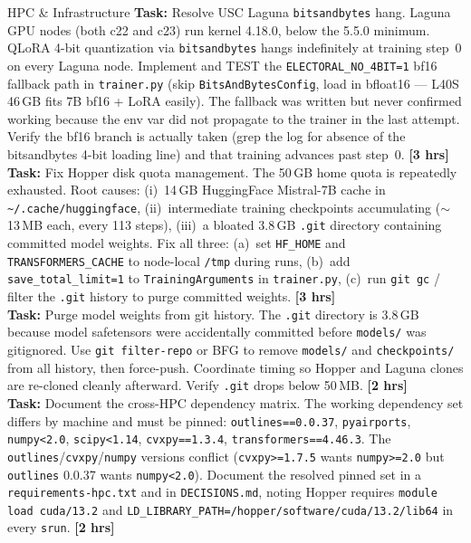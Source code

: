 \documentclass[11pt]{article}
\newcommand{\hrs}[1]{\textbf{[#1 hrs]}}
\newcommand{\task}[2]{%
  \noindent\textbf{Task:} #1 \hfill \hrs{#2}\\}
\begin{document}
\begin{taskbox}{HPC \& Infrastructure}
\task{Resolve USC Laguna \texttt{bitsandbytes} hang. Laguna GPU nodes (both c22
  and c23) run kernel 4.18.0, below the 5.5.0 minimum. QLoRA 4-bit
  quantization via \texttt{bitsandbytes} hangs indefinitely at training step~0
  on every Laguna node. Implement and TEST the \texttt{ELECTORAL\_NO\_4BIT=1}
  bf16 fallback path in \texttt{trainer.py} (skip \texttt{BitsAndBytesConfig},
  load in bfloat16 --- L40S 46\,GB fits 7B bf16 + LoRA easily). The fallback was
  written but never confirmed working because the env var did not propagate to
  the trainer in the last attempt. Verify the bf16 branch is actually taken
  (grep the log for absence of the bitsandbytes 4-bit loading line) and that
  training advances past step~0.}{3}

\task{Fix Hopper disk quota management. The 50\,GB home quota is repeatedly
  exhausted. Root causes: (i)~14\,GB HuggingFace Mistral-7B cache in
  \texttt{\textasciitilde{}/.cache/huggingface}, (ii)~intermediate training
  checkpoints accumulating ($\sim$13\,MB each, every 113 steps),
  (iii)~a bloated 3.8\,GB \texttt{.git} directory containing committed model
  weights. Fix all three: (a)~set \texttt{HF\_HOME} and
  \texttt{TRANSFORMERS\_CACHE} to node-local \texttt{/tmp} during runs,
  (b)~add \texttt{save\_total\_limit=1} to \texttt{TrainingArguments} in
  \texttt{trainer.py}, (c)~run \texttt{git gc} / filter the \texttt{.git}
  history to purge committed weights.}{3}

\task{Purge model weights from git history. The \texttt{.git} directory is
  3.8\,GB because model safetensors were accidentally committed before
  \texttt{models/} was gitignored. Use \texttt{git filter-repo} or BFG to
  remove \texttt{models/} and \texttt{checkpoints/} from all history, then
  force-push. Coordinate timing so Hopper and Laguna clones are re-cloned
  cleanly afterward. Verify \texttt{.git} drops below 50\,MB.}{2}

\task{Document the cross-HPC dependency matrix. The working dependency set
  differs by machine and must be pinned:
  \texttt{outlines==0.0.37}, \texttt{pyairports},
  \texttt{numpy\textless{}2.0}, \texttt{scipy\textless{}1.14},
  \texttt{cvxpy==1.3.4}, \texttt{transformers==4.46.3}.
  The \texttt{outlines}/\texttt{cvxpy}/\texttt{numpy} versions conflict
  (\texttt{cvxpy\textgreater{}=1.7.5} wants \texttt{numpy\textgreater{}=2.0}
  but \texttt{outlines} 0.0.37 wants \texttt{numpy\textless{}2.0}).
  Document the resolved pinned set in a \texttt{requirements-hpc.txt} and
  in \texttt{DECISIONS.md}, noting Hopper requires
  \texttt{module load cuda/13.2} and
  \texttt{LD\_LIBRARY\_PATH=/hopper/software/cuda/13.2/lib64} in every
  \texttt{srun}.}{2}


\end{taskbox}
\end{document}
